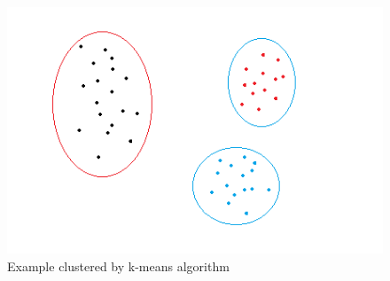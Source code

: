 \documentclass[a4paper,headsepline,footsepline,fontsize=11pt,BCOR=12mm,DIV=12]{report}
\begin{document}

\bigskip

\begin{figure}[h]
	\centering
	\includegraphics[scale=0.5]{./assets/cluster_seperate.png}
	\caption{Example clustered by k-means algorithm \cite{Yildirim2020}}
	\label{cluster_kmeans}
\end{figure}
\end{document}
